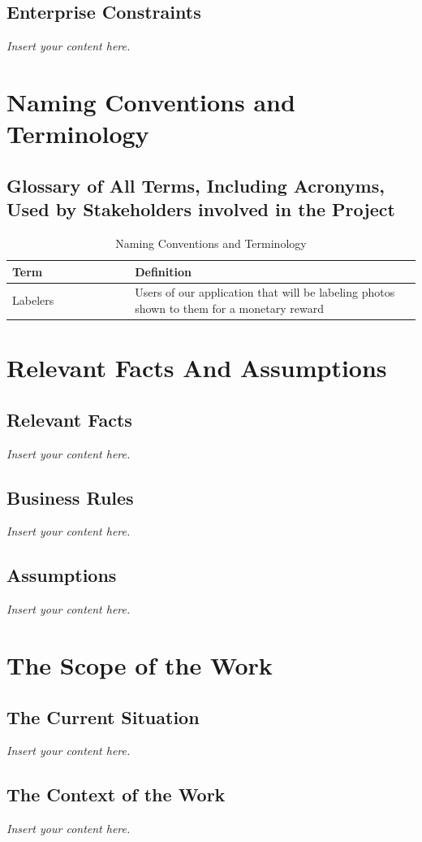 \documentclass[12pt]{article}
\newcommand{\lips}{\textit{Insert your content here.}}
\begin{document}
\subsection{Enterprise Constraints}
\lips

\section{Naming Conventions and Terminology}
\subsection{Glossary of All Terms, Including Acronyms, Used by Stakeholders
involved in the Project}
\begin{table}[H]
    \centering
    \begin{tabular}{|p{0.3\linewidth} | p{0.7\linewidth}| }
    \hline
    \textbf{Term} & \textbf{Definition}\\
    \hline
    Labelers & Users of our application that will be labeling photos shown to them for a monetary reward\\
    \hline
    \end{tabular}
    \caption{Naming Conventions and Terminology}
\end{table}

\section{Relevant Facts And Assumptions}
\subsection{Relevant Facts}
\lips
\subsection{Business Rules}
\lips
\subsection{Assumptions}
\lips

\section{The Scope of the Work}
\subsection{The Current Situation}
\lips
\subsection{The Context of the Work}
\lips
\end{document}
